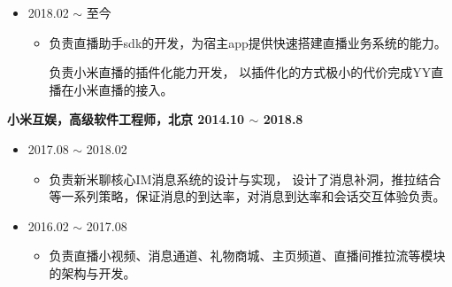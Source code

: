 \documentclass[line,margin,UTF8]{res}
\begin{document}
\begin{resume}
  \begin{itemize}
 \item {} 2018.02 $\sim$ 至今
 	\vspace{-3pt}
 	\begin{itemize}
 		\item 
 		负责直播助手sdk的开发，为宿主app提供快速搭建直播业务系统的能力。

 		负责小米直播的插件化能力开发，
 		以插件化的方式极小的代价完成YY直播在小米直播的接入。
 \end{itemize}
 \end{itemize}


{\bf 小米互娱，高级软件工程师，北京 \hfill  2014.10 $\sim$ 2018.8}
 \vspace{0pt}

 \begin{itemize}
 \item {} 2017.08 $\sim$ 2018.02
 	\vspace{-3pt}
 	\begin{itemize}
 		\item 
 		负责新米聊核心IM消息系统的设计与实现，
 		设计了消息补洞，推拉结合等一系列策略，保证消息的到达率，对消息到达率和会话交互体验负责。

 \end{itemize}
 \end{itemize}

 \begin{itemize}
 \item {} 2016.02 $\sim$ 2017.08
 	\vspace{-3pt}
 	\begin{itemize}
 		\item 
 		负责直播小视频、消息通道、礼物商城、主页频道、直播间推拉流等模块的架构与开发。
 		



\end{itemize}
\end{itemize}
\end{resume}
\end{document}
